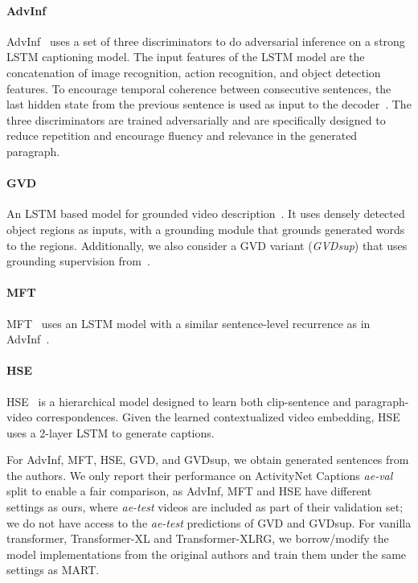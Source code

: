 \documentclass[11pt,a4paper]{article}
\begin{document}
\paragraph{AdvInf}
AdvInf~\cite{park2019adversarial} uses a set of three discriminators to do adversarial inference on a strong LSTM captioning model. 
The input features of the LSTM model are the concatenation of image recognition, action recognition, and object detection features. 
To encourage temporal coherence between consecutive sentences, the last hidden state from the previous sentence is used as input to the decoder~\cite{Xiong2018MoveFA, gella2018dataset}. 
The three discriminators are trained adversarially and are specifically designed to reduce repetition and encourage fluency and relevance in the generated paragraph.

\paragraph{GVD} 
An LSTM based model for grounded video description~\cite{Zhou2018GroundedVD}. 
It uses densely detected object regions as inputs, with a grounding module that grounds generated words to the regions. 
Additionally, we also consider a GVD variant (\textit{GVDsup}) that uses grounding supervision from~\citet{Zhou2018GroundedVD}. 

\paragraph{MFT} 
MFT~\cite{Xiong2018MoveFA} uses an LSTM model with a similar sentence-level recurrence as in AdvInf~\cite{park2019adversarial}. 

\paragraph{HSE} 
HSE~\cite{zhang2018cross} is a hierarchical model designed to learn both clip-sentence and paragraph-video correspondences. Given the learned contextualized video embedding, HSE uses a 2-layer LSTM to generate captions.

For AdvInf, MFT, HSE, GVD, and GVDsup, we obtain generated sentences from the authors. 
We only report their performance on ActivityNet Captions \textit{ae-val} split to enable a fair comparison, as  AdvInf, MFT and HSE have different settings as ours, where \textit{ae-test} videos are included as part of their validation set;  we do not have access to the \textit{ae-test} predictions of GVD and GVDsup.
For vanilla transformer, Transformer-XL and Transformer-XLRG, we borrow/modify the model implementations from the original authors and train them under the same settings as MART.
\end{document}
